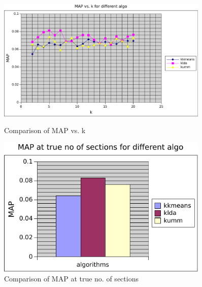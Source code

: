 \begin{figure}
\label{fig:mp_cmp}
    \centering
    \begin{minipage}{0.45\textwidth}
        \centering
        \includegraphics[width=0.9\textwidth]{fig/map_comp.pdf}
        \caption{Comparison of MAP vs. k}
    \end{minipage}\hfill
    \begin{minipage}{0.45\textwidth}
        \centering
        \includegraphics[width=0.9\textwidth]{fig/map_k0_comp.pdf}
        \caption{Comparison of MAP at true no. of sections}
    \end{minipage}
\end{figure}
